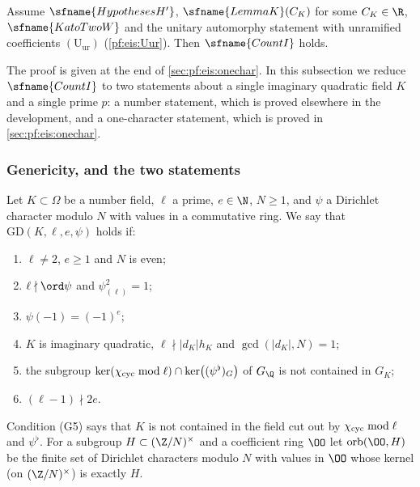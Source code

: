 \begin{theorem}\label{pf:eis:main}
Assume $\sfname{HypothesesH'}$, $\sfname{LemmaK}(C_K)$ for some $C_K\in\R$, $\sfname{KatoTwoW}$ and the unitary automorphy
statement with unramified coefficients $(\mathrm{U}_{\mathrm{ur}})$ (\cref{pf:eis:Uur}). Then $\sfname{CountI}$ holds.
\end{theorem}

The proof is given at the end of \cref{sec:pf:eis:onechar}. In this subsection we reduce $\sfname{CountI}$ to two
statements about a single imaginary quadratic field $K$ and a single prime $p$: a number statement, which is proved
elsewhere in the development, and a one-character statement, which is proved in \cref{sec:pf:eis:onechar}.

\subsubsection{Genericity, and the two statements}

\begin{definition}\label{pf:eis:GD}
Let $K\subset\Omega$ be a number field, $\ell$ a prime, $e\in\N$, $N\ge1$, and $\psi$ a Dirichlet character modulo $N$ with
values in a commutative ring. We say that $\mathrm{GD}(K,\ell,e,\psi)$ holds if:
\begin{enumerate}[label=(G\arabic*)]
\item $\ell\ne2$, $e\ge1$ and $N$ is even;
\item $\ell\nmid\ord\psi$ and $\psi_{(\ell)}^2=1$;
\item $\psi(-1)=(-1)^e$;
\item $K$ is imaginary quadratic, $\ell\nmid|d_K|h_K$ and $\gcd(|d_K|,N)=1$;
\item the subgroup $\ker(\chi_{\mathrm{cyc}}\bmod\ell)\cap\ker\bigl((\psi^\flat)_G\bigr)$ of $G_\Q$ is not contained in $G_K$;
\item $(\ell-1)\nmid2e$.
\end{enumerate}
\end{definition}

Condition (G5) says that $K$ is not contained in the field cut out by $\chi_{\mathrm{cyc}}\bmod\ell$ and $\psi^\flat$. For a
subgroup $H\subset(\Z/N)^\times$ and a coefficient ring $\OO$ let $\mathrm{orb}(\OO,H)$ be the finite set of Dirichlet
characters modulo $N$ with values in $\OO$ whose kernel (on $(\Z/N)^\times$) is exactly $H$.

